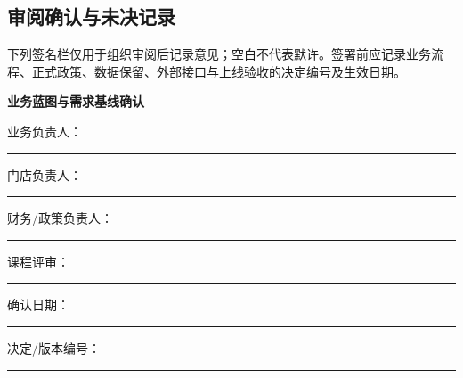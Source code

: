 
\subsection*{审阅确认与未决记录}
\noindent 下列签名栏仅用于组织审阅后记录意见；空白不代表默许。签署前应记录业务流程、正式政策、数据保留、外部接口与上线验收的决定编号及生效日期。
\begin{tcolorbox}[colback=IceLight,colframe=IceLight,boxrule=0pt,borderline west={3pt}{0pt}{Amber},left=3mm,right=3mm,top=3mm,bottom=3mm]
\textbf{业务蓝图与需求基线确认}\par\vspace{.5em}
业务负责人：\rule{32mm}{.4pt}\quad 门店负责人：\rule{32mm}{.4pt}\par\vspace{.7em}
财务/政策负责人：\rule{28mm}{.4pt}\quad 课程评审：\rule{28mm}{.4pt}\par\vspace{.7em}
确认日期：\rule{35mm}{.4pt}\quad 决定/版本编号：\rule{34mm}{.4pt}
\end{tcolorbox}
